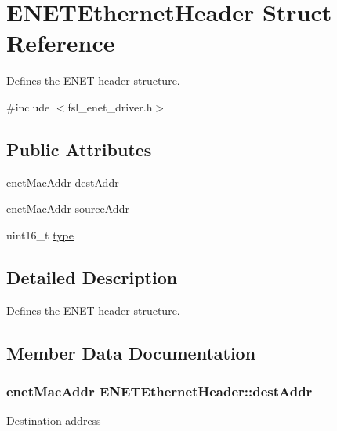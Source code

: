 \hypertarget{structENETEthernetHeader}{}\section{E\+N\+E\+T\+Ethernet\+Header Struct Reference}
\label{structENETEthernetHeader}


Defines the E\+N\+ET header structure.  




{\ttfamily \#include $<$fsl\+\_\+enet\+\_\+driver.\+h$>$}

\subsection*{Public Attributes}
\begin{DoxyCompactItemize}
\item 
enet\+Mac\+Addr \hyperlink{structENETEthernetHeader_a337dd536c458a25ad9f7cf2e11a04225}{dest\+Addr}
\item 
enet\+Mac\+Addr \hyperlink{structENETEthernetHeader_ab63793c54bf1ccd5d9c4b6b595033ded}{source\+Addr}
\item 
uint16\+\_\+t \hyperlink{structENETEthernetHeader_ae406ebfac78cda3771818ea5ada0472f}{type}
\end{DoxyCompactItemize}


\subsection{Detailed Description}
Defines the E\+N\+ET header structure. 

\subsection{Member Data Documentation}
\subsubsection[{\texorpdfstring{dest\+Addr}{destAddr}}]{\setlength{\rightskip}{0pt plus 5cm}enet\+Mac\+Addr E\+N\+E\+T\+Ethernet\+Header\+::dest\+Addr}\hypertarget{structENETEthernetHeader_a337dd536c458a25ad9f7cf2e11a04225}{}\label{structENETEthernetHeader_a337dd536c458a25ad9f7cf2e11a04225}
Destination address 
